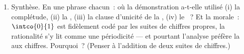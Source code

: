 \begin{problem}
\begin{enumerate}[resume]
        $\frac{1}{10}$ --- la raison pour laquelle le $0.1 + 0.2$
        d'un ordinateur en virgule flottante ne vaut pas exactement
        $0.3$.
  \item Synthèse. En une phrase chacun~: où la démonstration a-t-elle
        utilisé (i) la complétude, (ii) la ,
        (iii) la clause d'unicité de la , (iv) le
        ~? Et la morale~: $\intco{0}{1}$ est
        fidèlement codé par les suites de chiffres propres, la
        rationalité s'y lit comme une périodicité --- et pourtant
        l'analyse préfère la  aux chiffres.
        Pourquoi~? (Penser à l'addition de deux suites de chiffres.)
\end{enumerate}
\end{problem}
